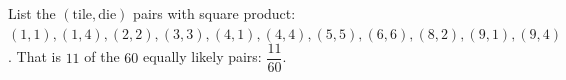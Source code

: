 List the $(\text{tile},\text{die})$ pairs with square product: $(1,1),(1,4),(2,2),(3,3),(4,1),(4,4),(5,5),(6,6),(8,2),(9,1),(9,4)$. That is $11$ of the $60$ equally likely pairs: $\boxed{\dfrac{11}{60}}$.
